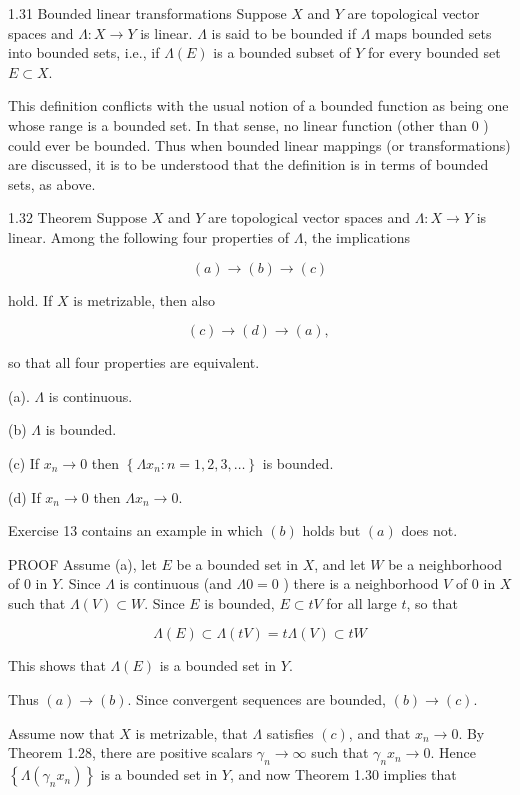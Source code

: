 \documentclass[10pt]{article}
\begin{document}
1.31 Bounded linear transformations Suppose $X$ and $Y$ are topological vector spaces and $\Lambda: X \rightarrow Y$ is linear. $\Lambda$ is said to be bounded if $\Lambda$ maps bounded sets into bounded sets, i.e., if $\Lambda(E)$ is a bounded subset of $Y$ for every bounded set $E \subset X$.

This definition conflicts with the usual notion of a bounded function as being one whose range is a bounded set. In that sense, no linear function (other than 0 ) could ever be bounded. Thus when bounded linear mappings (or transformations) are discussed, it is to be understood that the definition is in terms of bounded sets, as above.

1.32 Theorem Suppose $X$ and $Y$ are topological vector spaces and $\Lambda: X \rightarrow Y$ is linear. Among the following four properties of $\Lambda$, the implications

$$
(a) \rightarrow(b) \rightarrow(c)
$$

hold. If $X$ is metrizable, then also

$$
(c) \rightarrow(d) \rightarrow(a) \text {, }
$$

so that all four properties are equivalent.

(a). $\Lambda$ is continuous.

(b) $\Lambda$ is bounded.

(c) If $x_{n} \rightarrow 0$ then $\left\{\Lambda x_{n}: n=1,2,3, \ldots\right\}$ is bounded.

(d) If $x_{n} \rightarrow 0$ then $\Lambda x_{n} \rightarrow 0$.

Exercise 13 contains an example in which $(b)$ holds but $(a)$ does not.

PROOF Assume (a), let $E$ be a bounded set in $X$, and let $W$ be a neighborhood of 0 in $Y$. Since $\Lambda$ is continuous (and $\Lambda 0=0$ ) there is a neighborhood $V$ of 0 in $X$ such that $\Lambda(V) \subset W$. Since $E$ is bounded, $E \subset t V$ for all large $t$, so that

$$
\Lambda(E) \subset \Lambda(t V)=t \Lambda(V) \subset t W
$$

This shows that $\Lambda(E)$ is a bounded set in $Y$.

Thus $(a) \rightarrow(b)$. Since convergent sequences are bounded, $(b) \rightarrow(c)$.

Assume now that $X$ is metrizable, that $\Lambda$ satisfies $(c)$, and that $x_{n} \rightarrow 0$. By Theorem 1.28, there are positive scalars $\gamma_{n} \rightarrow \infty$ such that $\gamma_{n} x_{n} \rightarrow 0$. Hence $\left\{\Lambda\left(\gamma_{n} x_{n}\right)\right\}$ is a bounded set in $Y$, and now Theorem 1.30 implies that
\end{document}
